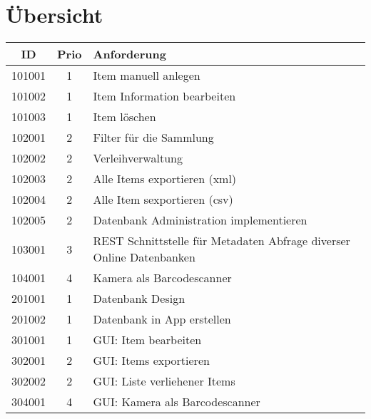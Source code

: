 \section{Übersicht}

\begin{table} [htbp]
	\begin{tabular}{|c|c|l|}
			\rowcolor{black} {\color{white}\textbf{ID}} & {\color{white}\textbf{Prio}} & {\color{white}\textbf{Anforderung}} \\ \hline
				101001 & 1 & Item manuell anlegen \\ \hline
				\rowcolor{DarkSeaGreen} 101002 & 1 & Item Information bearbeiten \\ \hline
				101003 & 1 & Item löschen \\ \hline
				\rowcolor{DarkSeaGreen} 102001 & 2 & Filter für die Sammlung \\ \hline
				102002 & 2 & Verleihverwaltung \\ \hline
				\rowcolor{DarkSeaGreen} 102003 & 2 & Alle Items exportieren (xml) \\ \hline
				102004 & 2 & Alle Item sexportieren (csv) \\ \hline
				\rowcolor{DarkSeaGreen} 102005 & 2 & Datenbank Administration implementieren \\ \hline
				103001 & 3 & REST Schnittstelle für Metadaten Abfrage diverser Online Datenbanken \\ \hline
				\rowcolor{DarkSeaGreen} 104001 & 4 & Kamera als Barcodescanner \\ \hline
				201001 & 1 & Datenbank Design \\ \hline
				\rowcolor{DarkSeaGreen} 201002 & 1 & Datenbank in App erstellen \\ \hline
				301001 & 1 & GUI: Item bearbeiten \\ \hline
				\rowcolor{DarkSeaGreen} 302001 & 2 & GUI: Items exportieren \\ \hline
				302002 & 2 & GUI: Liste verliehener Items \\ \hline
				\rowcolor{DarkSeaGreen} 304001 & 4 & GUI: Kamera als Barcodescanner \\ \hline
	\end{tabular}
\end{table}